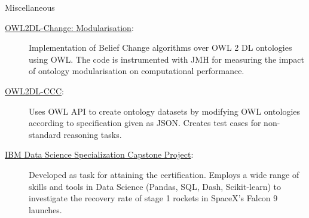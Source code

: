 \begin{rSection}{Miscellaneous}
\begin{description}
{            \begin{description}
                \item[]
                \item[\href{https://gitlab.com/rfguimaraes/owl-change}{OWL2DL-Change: Modularisation}:] Implementation of Belief Change algorithms over OWL 2 DL ontologies using OWL. The code is instrumented with JMH for measuring the impact of ontology modularisation on computational performance.
                \item[\href{https://gitlab.com/rfguimaraes/owl2dl-ccc}{OWL2DL-CCC}:] Uses OWL API to create ontology datasets by modifying OWL ontologies according to specification given as JSON. Creates test cases for non-standard reasoning tasks.
                \item[\href{https://github.com/rfguimaraes/DataScienceCapstone}{IBM Data Science Specialization Capstone Project}:] Developed as task for attaining the certification. Employs a wide range of skills and tools in Data Science (Pandas, SQL, Dash, Scikit-learn) to investigate the recovery rate of stage 1 rockets in SpaceX's Falcon 9 launches.
            \end{description}
        }
    \end{description} 
\end{rSection}
